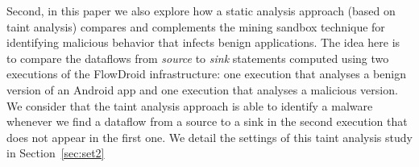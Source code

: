 



Second, in this paper we also explore how a static analysis approach
(based on taint analysis) compares and complements the mining sandbox technique
for identifying malicious behavior that infects benign applications.
The idea here is to compare the dataflows from \emph{source} to
\emph{sink} statements computed using two executions of the
FlowDroid infrastructure: one execution that analyses
a benign version of an Android app and one execution that
analyses a malicious version. We consider that
the taint analysis approach is able to identify a malware whenever
we find a dataflow from a source to a sink in the second execution
that does not appear in the first one. We detail the
settings of this taint analysis study in Section~\ref{sec:set2}

